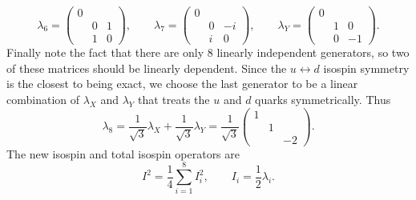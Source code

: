 \begin{equation}
  \lambda_6=\left(\begin{array}{ccc}
            0 &   &  \\
              & 0 & 1\\
              & 1 & 0
            \end{array}\right), \qquad
  \lambda_7=\left(\begin{array}{ccc}
            0 &    &   \\
              & 0  & -i\\
              & i  & 0
            \end{array}\right), \qquad
  \lambda_Y=\left(\begin{array}{ccc}
           0  &    &  \\
              & 1  & 0\\
              & 0  & -1 
            \end{array}\right).
\end{equation}
Finally note the fact that there are only 8 linearly independent generators, so
two of these matrices should be linearly dependent. Since the
$u\leftrightarrow d$ isospin symmetry is the closest to being exact, we choose
the last generator to be a linear combination of $\lambda_X$ and $\lambda_Y$
that treats the $u$ and $d$ quarks symmetrically. Thus
\begin{equation}
  \lambda_8=\frac{1}{\sqrt{3}}\lambda_X+\frac{1}{\sqrt{3}}\lambda_Y
           =\frac{1}{\sqrt{3}}\left(\begin{array}{ccc}
            1 &   &   \\
              & 1 &   \\
              &   & -2
            \end{array}\right).
\end{equation}
The new isospin and total isospin operators are
\begin{equation}
  I^2=\frac{1}{4}\sum\limits_{i=1}^8 I_i^2, \qquad I_i=\frac{1}{2}\lambda_i.
\end{equation}

